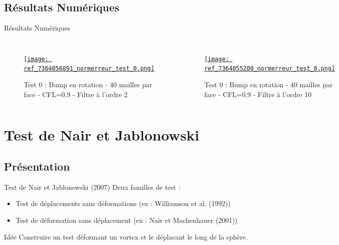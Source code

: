 \documentclass[11pt]{beamer}
\begin{document}
\subsection{Résultats Numériques}
\begin{frame}{Résultats Numériques}
\begin{columns}

\begin{figure}
\href{run:ref_7363895782_test_0.avi}{\texttt{[image: ref\_7364056891\_normerreur\_test\_0.png]}} 
\caption{Test 0 : Bump en rotation - 40 mailles par face - CFL=0.9 -
  Filtre à l'ordre 2 }
\end{figure}

\begin{figure}
\href{run:ref_7363896161_test_0.avi}{\texttt{[image: ref\_7364055200\_normerreur\_test\_0.png]}} 
\caption{Test 0 : Bump en rotation - 40 mailles par face - CFL=0.9 -
  Filtre à l'ordre 10 }
\end{figure}
\end{columns}
\end{frame}



\section{Test de Nair et Jablonowski}
\subsection{Présentation}
\begin{frame}{Test de Nair et Jablonowski (2007)}
Deux familles de test :
\begin{itemize}
\item Test de déplacements sans déformations (ex : Williamson et
  al. (1992))\\
\item Test de déformation sans déplacement (ex :  Nair et Machenhauer (2001))
\end{itemize}

\begin{block}{Idée}
Construire un test déformant un vortex et le déplacant le long de la sphère.
\end{block}
\end{frame}
\end{document}
